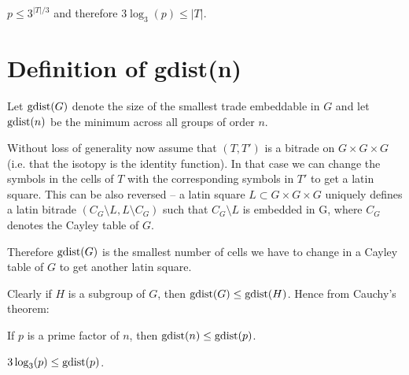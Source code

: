 \begin{cor}
$p \leq 3^{|T|/3}$ and therefore $3 \log_3(p) \leq |T|$.
\end{cor}%


\section{Definition of gdist(n)}

\begin{defn}
Let \emph{$\mathop{\mathrm{gdist}}(G)$} denote the size of the smallest trade embeddable in $G$ and let \emph{$\mathop{\mathrm{gdist}}(n)$} be the minimum across all groups of order $n$.
\end{defn}

Without loss of generality now assume that $(T,T')$ is a bitrade on $G \times G \times G$  (i.e. that the isotopy is the identity function). In that case we can change the symbols in the cells of $T$ with the corresponding symbols in $T'$ to get a latin square. This can be also reversed -- a latin square $L \subset G \times G \times G$ uniquely defines a latin bitrade $(C_G\setminus L, L\setminus C_G)$ such that $C_G\setminus L$ is embedded in G, where $C_G$ denotes the Cayley table of $G$.

Therefore $\mathop{\mathrm{gdist}}(G)$ is the smallest number of cells we have to change in a Cayley table of $G$ to get another latin square.


Clearly if $H$ is a subgroup of $G$, then $\mathop{\mathrm{gdist}}(G) \leq \mathop{\mathrm{gdist}}(H)$. Hence from Cauchy's theorem:

\begin{lem}
\label{lem:gdist-n-leq-gdist-p}
If $p$ is a prime factor of $n$, then $\mathop{\mathrm{gdist}}(n) \leq \mathop{\mathrm{gdist}}(p)$.
\end{lem}%

\begin{lem}
$3\log_3(p) \leq \mathop{\mathrm{gdist}}(p)$.
\end{lem}%

